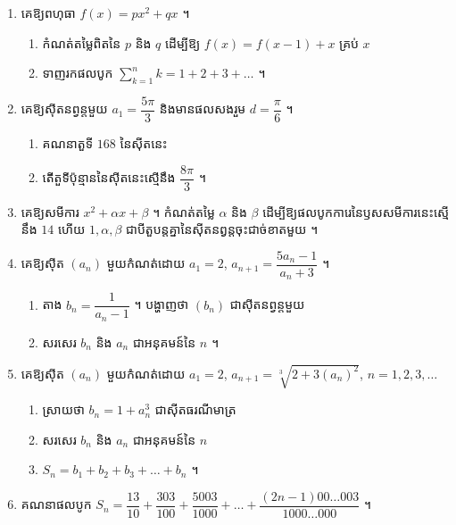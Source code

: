 \begin{enumerate}[1]
  \begin{enumerate}[a]
    \item តាង $b_n = \dfrac{1}{(a_n)^2}$ ។ បង្ហាញថា $(b_n)$ ជាស៊ីតនព្វន្តមួយ
    \item គណនា $b_n$, $S_n = \displaystyle\sum_{k=1}^{n} b_k$ និង $a_n$ ជាអនុគមន៍នៃ $n$ ។
  \end{enumerate}
  \item គេឱ្យពហុធា $f(x) = px^2 + qx$ ។
  \begin{enumerate}[a]
    \item កំណត់តម្លៃពិតនៃ $p$ និង $q$ ដើម្បីឱ្យ $f(x) = f(x - 1) + x$ គ្រប់ $x$
    \item ទាញរកផលបូក $\displaystyle\sum_{k=1}^{n} k = 1 + 2 + 3 + \ldots$ ។
  \end{enumerate}
  \item គេឱ្យស៊ីតនព្វន្តមួយ $a_1 = \dfrac{5\pi}{3}$ និងមានផលសងរួម $d = \dfrac{\pi}{6}$ ។
  \begin{enumerate}[a]
    \item គណនាតួទី $168$ នៃស៊ីតនេះ
    \item តើតួទីប៉ុន្មាននៃស៊ីតនេះស្មើនឹង $\dfrac{8\pi}{3}$ ។
  \end{enumerate}
  \item គេឱ្យសមីការ $x^2 + \alpha x + \beta$ ។ កំណត់តម្លៃ $\alpha$ និង $\beta$ ដើម្បីឱ្យផលបូកការេនៃឫសសមីការនេះស្មើនឹង $14$ ហើយ $1, \alpha, \beta$ ជាបីតួបន្តគ្នានៃស៊ីតនព្វន្តចុះជាច់ខាតមួយ ។
  \item គេឱ្យស៊ីត $(a_n)$ មួយកំណត់ដោយ $a_1 = 2$, $a_{n+1} = \dfrac{5a_n - 1}{a_n + 3}$ ។
  \begin{enumerate}[a]
    \item តាង $b_n = \dfrac{1}{a_n - 1}$ ។ បង្ហាញថា $(b_n)$ ជាស៊ីតនព្វន្តមួយ
    \item សរសេរ $b_n$ និង $a_n$ ជាអនុគមន៍នៃ $n$ ។
  \end{enumerate}
  \item គេឱ្យស៊ីត $(a_n)$ មួយកំណត់ដោយ $a_1 = 2$, $a_{n+1} = \sqrt[3]{2 + 3(a_n)^2}$, $n = 1, 2, 3, \ldots$
  \begin{enumerate}[a]
    \item ស្រាយថា $b_n = 1 + a_n^3$ ជាស៊ីតធរណីមាត្រ
    \item សរសេរ $b_n$ និង $a_n$ ជាអនុគមន៍នៃ $n$
    \item $S_n = b_1 + b_2 + b_3 + \ldots + b_n$ ។
  \end{enumerate}
  \item គណនាផលបូក $S_n = \dfrac{13}{10} + \dfrac{303}{100} + \dfrac{5003}{1000} + \ldots + \dfrac{(2n - 1)00\ldots003}{1000\ldots000}$ ។

\end{enumerate}

